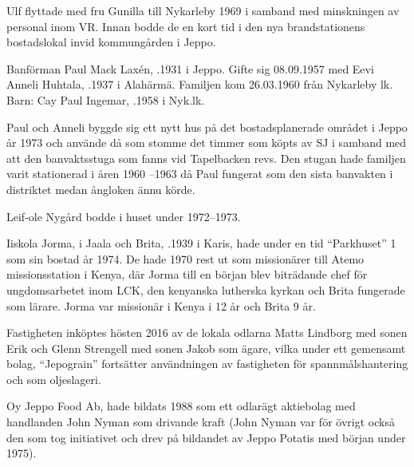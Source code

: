 {Ulf flyttade med fru Gunilla till Nykarleby 1969 i samband med minskningen av personal inom VR. Innan bodde de en kort tid i den nya brandstationens bostadslokal invid kommungården i Jeppo.


Banförman Paul Mack Laxén, .1931 i Jeppo. Gifte sig 08.09.1957 med Eevi Anneli Huhtala, .1937 i Alahärmä.  Familjen kom 26.03.1960 från Nykarleby lk.
Barn: Cay Paul Ingemar, .1958 i Nyk.lk.

Paul och Anneli byggde sig ett nytt hus på det bostadsplanerade området i Jeppo år 1973  och använde då som stomme det timmer som köpts av SJ i samband med att den banvaktsstuga som fanns vid Tapelbacken revs. Den stugan hade familjen varit stationerad i åren 1960 –1963 då Paul fungerat som den sista banvakten i distriktet medan ångloken ännu körde.

Leif-ole Nygård bodde i huset under 1972--1973.

Iiskola Jorma,  i Jaala och Brita, .1939 i Karis, hade under en tid ``Parkhuset'' 1 som sin bostad år 1974. De hade 1970 rest ut som missionärer till Atemo missionsstation i Kenya, där Jorma till en början blev biträdande chef för ungdomsarbetet inom LCK, den kenyanska lutherska kyrkan och Brita fungerade som lärare. Jorma var missionär i Kenya i 12 år och Brita 9 år.














Fastigheten inköptes hösten 2016 av de lokala odlarna Matts Lindborg med sonen Erik och Glenn Strengell med sonen Jakob som ägare, vilka under ett gemensamt bolag, ``Jepograin'' fortsätter användningen av fastigheten för spannmålshantering och som oljeslageri.



Oy Jeppo Food Ab, hade bildats 1988 som ett odlarägt aktiebolag med handlanden John Nyman som drivande kraft (John Nyman var för övrigt också den som tog initiativet och drev på bildandet av Jeppo Potatis med början under 1975).

}
